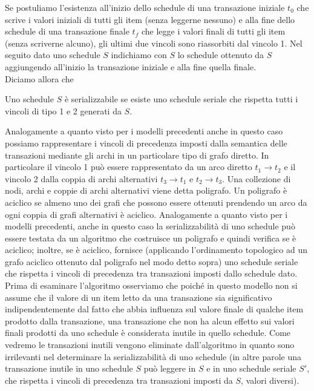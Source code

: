 Se postuliamo l'esistenza all'inizio dello schedule di una transazione iniziale $t_0$ che scrive i valori
iniziali di tutti gli item (senza leggerne nessuno) e alla fine dello schedule di una transazione finale
$t_f$ che legge i valori finali di tutti gli item (senza scriverne alcuno), gli ultimi due vincoli sono
riassorbiti dal vincolo 1. Nel seguito dato uno schedule $S$ indichiamo con $S$ lo schedule ottenuto da
$S$ aggiungendo all'inizio la transazione iniziale e alla fine quella finale.\\

Diciamo allora che
\begin{defn}
 Uno schedule $S$ è serializzabile se esiste uno schedule seriale che rispetta tutti i
vincoli di tipo 1 e 2 generati da $S$.
\end{defn}

Analogamente a quanto visto per i modelli precedenti anche in questo caso possiamo rappresentare i
vincoli di precedenza imposti dalla semantica delle transazioni mediante gli archi in un particolare
tipo di grafo diretto. In particolare il vincolo 1 può essere rappresentato da un arco diretto $t_1\rightarrow t_2$ e
il vincolo 2 dalla coppia di archi alternativi $t_3\rightarrow t_1$ e $t_2\rightarrow t_3$. Una collezione di nodi, archi e
coppie di archi alternativi viene detta poligrafo. Un poligrafo è aciclico se almeno uno dei grafi che
possono essere ottenuti prendendo un arco da ogni coppia di grafi alternativi è aciclico.
Analogamente a quanto visto per i modelli precedenti, anche in questo caso la serializzabilità di uno
schedule può essere testata da un algoritmo che costruisce un poligrafo e quindi verifica se è
aciclico; inoltre, se è aciclico, fornisce (applicando l'ordinamento topologico ad un grafo aciclico
ottenuto dal poligrafo nel modo detto sopra) uno schedule seriale che rispetta i vincoli di
precedenza tra transazioni imposti dallo schedule dato. Prima di esaminare l'algoritmo osserviamo
che poiché in questo modello non si assume che il valore di un item letto da una transazione sia
significativo indipendentemente dal fatto che abbia influenza sul valore finale di qualche item
prodotto dalla transazione, una transazione che non ha alcun effetto sui valori finali prodotti da uno
schedule è considerata inutile in quello schedule. Come vedremo le transazioni inutili vengono
eliminate dall'algoritmo in quanto sono irrilevanti nel determinare la serializzabilità di uno schedule
(in altre parole una transazione inutile in uno schedule $S$ può leggere in $S$ e in uno schedule seriale
$S'$, che rispetta i vincoli di precedenza tra transazioni imposti da $S$, valori diversi).

